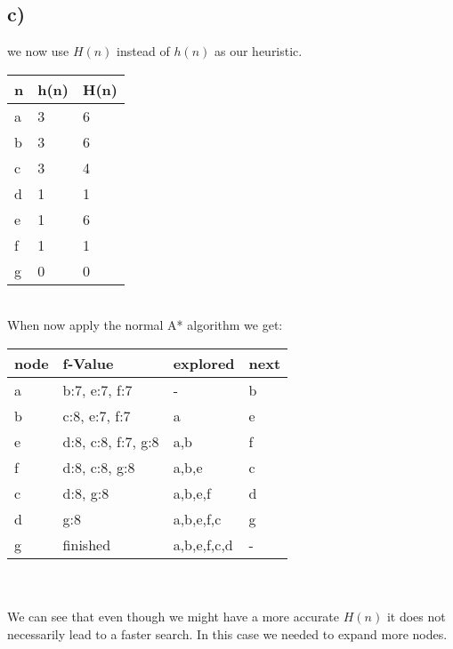\documentclass[12pt,a4paper]{scrartcl}
\begin{document}
\subsection*{c)}
	we now use $H(n)$ instead of $h(n)$ as our heuristic. \\
	\begin{tabular}{l | l | l }
		n & h(n) & H(n) \\ \hline
		a & 3 & 6 \\
		b & 3 & 6 \\
		c & 3 & 4 \\
		d & 1 & 1 \\
		e & 1 & 6 \\
		f & 1 & 1 \\
		g & 0 & 0 
	\end{tabular}\\
	When now apply the normal A* algorithm we get:\\
	\begin{tabular}{|l | l | l | l |}
		node & f-Value & explored & next \\ \hline
		a & b:7, e:7, f:7 & -  & b \\
		b & c:8, e:7, f:7 & a & e \\
		e & d:8, c:8, f:7, g:8 & a,b & f \\
		f & d:8, c:8, g:8 & a,b,e  & c \\
		c & d:8, g:8 & a,b,e,f & d \\
		d & g:8 & a,b,e,f,c & g \\
		g & finished & a,b,e,f,c,d & - 
	\end{tabular}\\\\
	We can see that even though we might have a more accurate $H(n)$ it does not necessarily lead to a faster search. In this case we needed to expand more nodes. 
\end{document}

